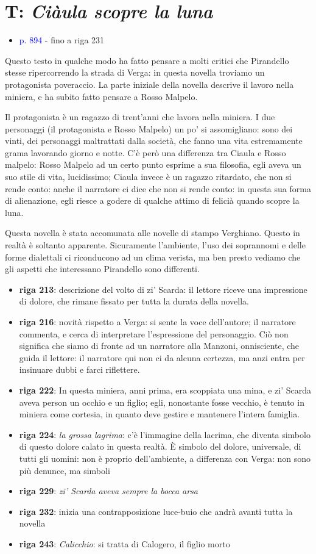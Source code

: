 \documentclass[a4paper, twoside, titlepage]{book}
\newcommand{\elenco}[1]{%
\begin{itemize}
#1
\end{itemize}}
\renewcommand{\emph}[1]{\textcolor{blue}{#1}}
\begin{document}
\chapter{T: \textit{Ciàula scopre la luna}}
\elenco{\item \emph{p. 894} - fino a riga 231}

Questo testo in qualche modo ha fatto pensare a molti critici che Pirandello stesse ripercorrendo la strada di Verga: in questa novella troviamo un protagonista poveraccio.
La parte iniziale della novella descrive il lavoro nella miniera, e ha subito fatto pensare a Rosso Malpelo.

Il protagonista è un ragazzo di trent'anni che lavora nella miniera. I due personaggi (il protagonista e Rosso Malpelo) un po' si assomigliano: sono dei vinti, dei personaggi maltrattati dalla società, che fanno una vita estremamente grama lavorando giorno e notte.
C'è però una differenza tra Ciaula e Rosso malpelo: Rosso Malpelo ad un certo punto esprime a sua filosofia, egli aveva un suo stile di vita, lucidissimo; Ciaula invece è un ragazzo ritardato, che non si rende conto: anche il narratore ci dice che non si rende conto: in questa sua forma di alienazione, egli riesce a godere di qualche attimo di felicià quando scopre la luna.

Questa novella è stata accomunata alle novelle di stampo Verghiano.
Questo in realtà è soltanto apparente. Sicuramente l'ambiente, l'uso dei soprannomi e delle forme dialettali ci riconducono ad un clima verista, ma ben presto vediamo che gli aspetti che interessano Pirandello sono differenti.

\elenco{\item \textbf{riga 213}: descrizione del volto di zi' Scarda:  il lettore riceve una impressione di dolore, che rimane fissato per tutta la durata della novella.
\item \textbf{riga 216}: novità rispetto a Verga: si sente la voce dell'autore; il narratore commenta, e cerca di interpretare l'espressione del personaggio. Ciò non significa che siamo di fronte ad un narratore alla Manzoni, onnisciente, che guida il lettore: il narratore qui non ci da alcuna certezza, ma anzi entra per insinuare dubbi e farci riflettere.
\item \textbf{riga 222}: In questa miniera, anni prima, era scoppiata una mina, e zi' Scarda aveva person un occhio e un figlio; egli, nonostante fosse vecchio, è tenuto in miniera come cortesia, in quanto deve gestire e mantenere l'intera famiglia.
\item \textbf{riga 224}: \textit{la grossa lagrima}: c'è l'immagine della lacrima, che diventa simbolo di questo dolore calato in questa realtà. È simbolo del dolore, universale, di tutti gli uomini: non è proprio dell'ambiente, a differenza con Verga: non sono più denunce, ma simboli
\item \textbf{riga 229}: \textit{zi' Scarda aveva sempre la bocca arsa}
\item \textbf{riga 232}: inizia una contrapposizione luce-buio che andrà avanti tutta la novella
\item \textbf{riga 243}: \textit{Calicchio}: si tratta di Calogero, il figlio morto
}
\end{document}

